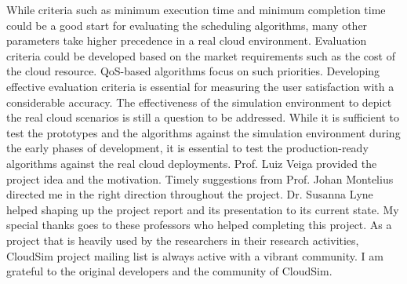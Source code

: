 \documentclass[times, 10pt,twocolumn]{article}
\begin{document}
While criteria such as minimum execution time and minimum completion time could be a good start for evaluating the scheduling algorithms, many other parameters take higher precedence in a real cloud environment. Evaluation criteria could be developed based on the market requirements such as the cost of the cloud resource. QoS-based algorithms focus on such priorities. Developing effective evaluation criteria is essential for measuring the user satisfaction with a considerable accuracy. The effectiveness of the simulation environment to depict the real cloud scenarios is still a question to be addressed. While it is sufficient to test the prototypes and the algorithms against the simulation environment during the early phases of development, it is essential to test the production-ready algorithms against the real cloud deployments.
Prof. Luiz Veiga provided the project idea and the motivation. Timely suggestions from Prof. Johan Montelius directed me in the right direction throughout the project. Dr. Susanna Lyne helped shaping up the project report and its presentation to its current state. My special thanks goes to these professors who helped completing this project. As a project that is heavily used by the researchers in their research activities, CloudSim project mailing list is always active with a vibrant community. I am grateful to the original developers and the community of CloudSim.
\end{document}
